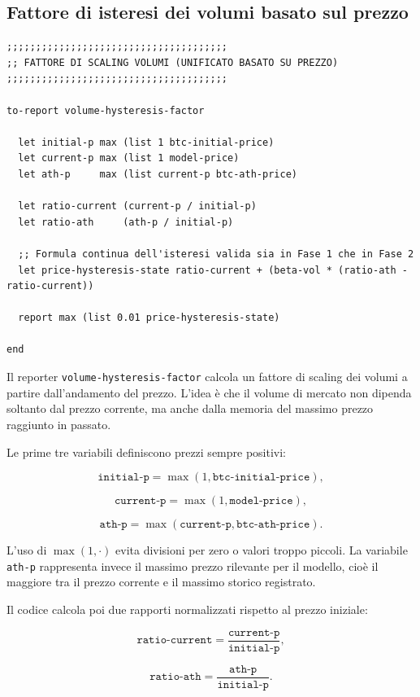 \subsection{Fattore di isteresi dei volumi basato sul prezzo}

\begin{lstlisting}[caption={Reporter per il fattore di scaling dei volumi}]
;;;;;;;;;;;;;;;;;;;;;;;;;;;;;;;;;;;;;;
;; FATTORE DI SCALING VOLUMI (UNIFICATO BASATO SU PREZZO)
;;;;;;;;;;;;;;;;;;;;;;;;;;;;;;;;;;;;;;

to-report volume-hysteresis-factor

  let initial-p max (list 1 btc-initial-price)
  let current-p max (list 1 model-price)
  let ath-p     max (list current-p btc-ath-price)

  let ratio-current (current-p / initial-p)
  let ratio-ath     (ath-p / initial-p)

  ;; Formula continua dell'isteresi valida sia in Fase 1 che in Fase 2
  let price-hysteresis-state ratio-current + (beta-vol * (ratio-ath - ratio-current))

  report max (list 0.01 price-hysteresis-state)

end
\end{lstlisting}

Il reporter \texttt{volume-hysteresis-factor} calcola un fattore di scaling dei
volumi a partire dall'andamento del prezzo. L'idea è che il volume di mercato non
dipenda soltanto dal prezzo corrente, ma anche dalla memoria del massimo prezzo
raggiunto in passato.

Le prime tre variabili definiscono prezzi sempre positivi:

\[
\texttt{initial-p} = \max(1,\texttt{btc-initial-price}),
\]

\[
\texttt{current-p} = \max(1,\texttt{model-price}),
\]

\[
\texttt{ath-p} = \max(\texttt{current-p},\texttt{btc-ath-price}).
\]

L'uso di \(\max(1,\cdot)\) evita divisioni per zero o valori troppo piccoli. La
variabile \texttt{ath-p} rappresenta invece il massimo prezzo rilevante per il
modello, cioè il maggiore tra il prezzo corrente e il massimo storico registrato.

Il codice calcola poi due rapporti normalizzati rispetto al prezzo iniziale:

\[
\texttt{ratio-current}
=
\frac{\texttt{current-p}}{\texttt{initial-p}},
\]

\[
\texttt{ratio-ath}
=
\frac{\texttt{ath-p}}{\texttt{initial-p}}.
\]

